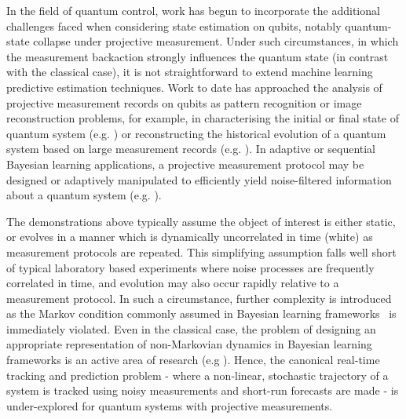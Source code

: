 In the field of quantum control, work has begun to incorporate the additional challenges faced when considering state estimation on qubits, notably quantum-state collapse under projective measurement.  Under such circumstances, in which the measurement backaction strongly influences the quantum state (in contrast with the classical case), it is not straightforward to extend machine learning predictive estimation techniques.  Work to date has approached the analysis of projective measurement records on qubits as pattern recognition or image reconstruction problems, for example, in characterising the initial or final state of quantum system (e.g. \cite{struchalin2016experimental, sergeevich2011characterization, mahler2013adaptive}) or reconstructing the historical evolution of a quantum system based on large measurement records (e.g. \cite{stenberg2016characterization, shabani2011efficient, shen2014reconstructing, de2016estimation, tan2015prediction, huang2017neural}). In adaptive or sequential Bayesian learning applications, a projective measurement protocol may be designed or adaptively manipulated to efficiently yield noise-filtered information about a quantum system (e.g. \cite{bonato2016optimized, wiebe2015bayesian}). 

The demonstrations above typically assume the object of interest is either static, or evolves in a manner which is dynamically uncorrelated in time (white) as measurement protocols are repeated. This simplifying assumption falls well short of typical laboratory based experiments where noise processes are frequently correlated in time, and evolution may also occur rapidly relative to a measurement protocol. In such a circumstance, further complexity is introduced as the Markov condition commonly assumed in Bayesian learning frameworks~\cite{candy2016bayesian} is immediately violated.  Even in the classical case, the problem of designing an appropriate representation of non-Markovian dynamics in Bayesian learning frameworks is an active area of research (e.g  \cite{jacob2017bayesian}).  Hence, the canonical real-time tracking and prediction problem - where a non-linear, stochastic trajectory of a system is tracked using noisy measurements and short-run forecasts are made - is under-explored for quantum systems with projective measurements.

